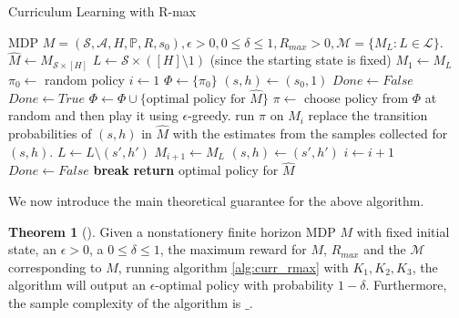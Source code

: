 \documentclass[12pt, letterpaper]{article}
\theoremstyle{definition}
\newtheorem*{thm}{Theorem}
\theoremstyle{remark}
\begin{document}
\begin{algorithm}[H]
    \caption{Curriculum Learning with R-max}
    \label{alg:curr_rmax}
\begin{algorithmic}[1]
    \Require MDP \(M = (\mathcal{S}, \mathcal{A}, H, \mathbb{P}, R, s_0), \epsilon > 0, 0 \leq\delta \leq 1, R_{max} > 0, \mathcal{M} = \{M_L : L \in \mathcal{L}\}\).
        \State \(\hat{M} \gets M_{\mathcal{S} \times [H]}\)
        \State $L \gets \mathcal{S} \times ([H] \setminus 1)$ (since the starting state is fixed)
        \State $M_{1} \gets M_L$
        \State $\pi_0 \gets $ random policy
        \State $i \gets 1$
        \State $\Phi \gets \{\pi_0\}$
        \State $(s, h) \gets (s_0, 1)$
        \State \(Done \gets False\)
            \State \(Done \gets True\)
            \State \(\Phi \gets \Phi \cup \{\text{optimal policy for } \hat{M}\}\)
            \State \(\pi \gets \) choose policy from \(\Phi\) at random and then play it using \(\epsilon\)-greedy.
                \State run \(\pi\) on \(M_i\)
                    \State replace the transition probabilities of \((s, h)\) in \(\hat{M}\) with the estimates from the samples collected for \((s, h)\).
                    \State \(L \gets L \setminus (s', h')\)
                    \State \(M_{i+1} \gets M_{L}\)
                    \State \((s, h) \gets (s', h')\)
                    \State \(i \gets i+1\)
                    \State \(Done \gets False\)
                    \State \textbf{break}
                \EndIf
            \EndWhile
        \EndWhile
        \State \textbf{return} optimal policy for \(\hat{M}\)

    \EndProcedure
\end{algorithmic}
\end{algorithm}

We now introduce the main theoretical guarantee for the above algorithm.

\begin{thm}[]
    Given a nonstationery finite horizon MDP \(M\) with fixed initial state, an \(\epsilon > 0\), a \(0 \leq \delta \leq 1\), the maximum reward for \(M\), \(R_{max}\) and the \(\mathcal{M}\) corresponding to \(M\), running algorithm \ref{alg:curr_rmax} with \(K_1, K_2, K_3\), the algorithm will output an \(\epsilon\)-optimal policy with probability \(1 - \delta\). Furthermore, the sample complexity of the algorithm is \(\_\).
\end{thm}
\end{document}

